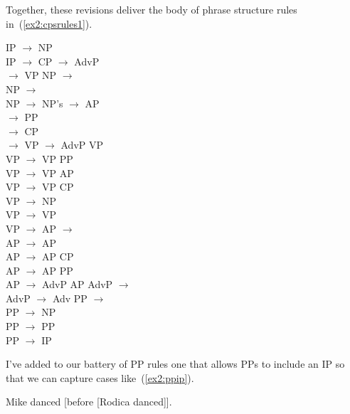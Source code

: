 Together, these revisions deliver the body of phrase structure rules in~(\ref{ex2:cpsrules1}).
\begin{exe}
	\raggedright
	\ex \label{ex2:cpsrules1} 
	\begin{xlist}
		\ex IP $\rightarrow$ NP \\ IP $\rightarrow$ CP 
		\ex {} $\rightarrow$ AdvP \ibar{I}\\  $\rightarrow$  VP
		\ex NP $\rightarrow$ \\
	NP $\rightarrow$  \\
	NP $\rightarrow$ NP's 
	\ex
	 $\rightarrow$ AP \\
	 $\rightarrow$  PP\\
	 $\rightarrow$  CP\\
	 $\rightarrow$ 
	\ex
	VP $\rightarrow$ AdvP VP\\
	VP $\rightarrow$ VP PP\\
	VP $\rightarrow$ VP AP\\
	VP $\rightarrow$ VP CP\\
	VP $\rightarrow$  NP\\
	VP $\rightarrow$  VP\\
	VP $\rightarrow$ 
	\ex
	AP $\rightarrow$ \\
	AP $\rightarrow$  AP\\
	AP $\rightarrow$ AP CP\\
	AP $\rightarrow$ AP PP\\
	AP $\rightarrow$ AdvP AP
	\ex
	AdvP $\rightarrow$ \\
	AdvP $\rightarrow$  Adv
	\ex 
	PP $\rightarrow$ \\
	PP $\rightarrow$  NP\\
	PP $\rightarrow$  PP\\
	PP $\rightarrow$  IP
	\end{xlist}
\end{exe}
I've added to our battery of PP rules one that allows PPs to include an IP so that we can capture cases like~(\ref{ex2:ppip}).
\begin{exe}
	\raggedright
	\ex \label{ex2:ppip} 
	Mike danced [\PP before [\IP Rodica danced]].
\end{exe}

